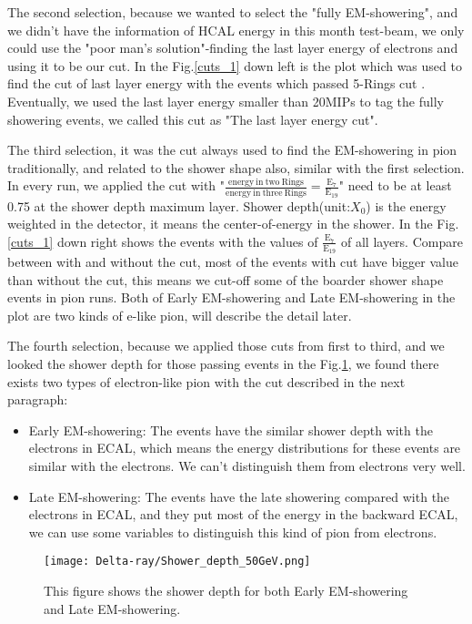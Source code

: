 \documentclass[12pt,twoside,a4paper,an,final]{cms-tdr}
\begin{document}
The second selection, because we wanted to select the "fully EM-showering", and we didn't have the information of HCAL energy in this month test-beam, we only could use the "poor man's solution"-finding the last layer energy of electrons and using it to be our cut. In the Fig.\ref{cuts_1} down left is the plot which was used to find the cut of last layer energy with the events which passed 5-Rings cut . Eventually, we used the last layer energy smaller than 20MIPs to tag the fully showering events, we called this cut as "The last layer energy cut".

The third selection, it was the cut always used to find the EM-showering in pion traditionally, and related to the shower shape also, similar with the first selection. In every run, we applied the cut with "$\frac{\mathrm{energy \ in \ two \ Rings}}{\mathrm{energy \ in \ three \ Rings}} = \frac{\mathrm{E_{7}}}{\mathrm{E_{19}}}$" need to be at least 0.75 at the shower depth maximum layer. Shower depth(unit:$X_{0}$) is the energy weighted in the detector, it means the center-of-energy in the shower. In the Fig.\ref{cuts_1} down right shows the events with the values of $\frac{\mathrm{E_{7}}}{\mathrm{E_{19}}}$ of all layers. Compare between with and without the cut, most of the events with cut have bigger value than without the cut, this means we cut-off some of the boarder shower shape events in pion runs. Both of Early EM-showering and Late EM-showering in the plot are two kinds of e-like pion, will describe the detail later.

The fourth selection, because we applied those cuts from first to third, and we looked the shower depth for those passing events in the Fig.\ref{HGCAL_shower_depth}, we found there exists two types of electron-like pion with the cut described in the next paragraph:
\begin{itemize}
\item Early EM-showering: The events have the similar shower depth with the electrons in ECAL, which means the energy distributions for these events are similar with the electrons. We can't distinguish them from electrons very well.
\item Late  EM-showering: The events have the late showering compared with the electrons in ECAL, and they put most of the energy in the backward ECAL, we can use some variables to distinguish this kind of pion from electrons.
\end{itemize}

\begin{figure}[!htb]
\centering 
     \texttt{[image: Delta-ray/Shower\_depth\_50GeV.png]}
\caption{This figure shows the shower depth for both Early EM-showering and Late EM-showering.}
\label{HGCAL_shower_depth}
\end{figure}
\end{document}
